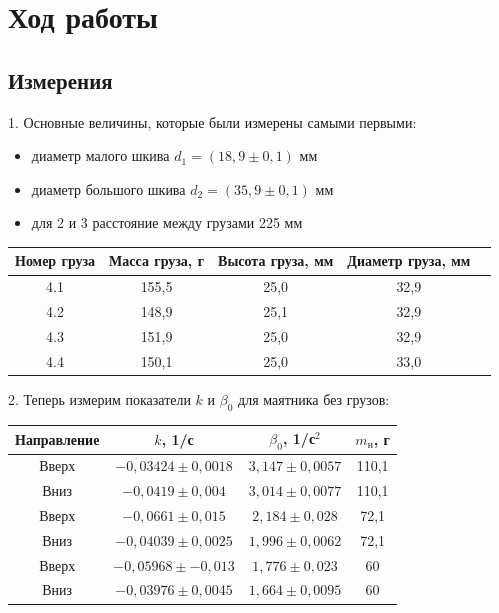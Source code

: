 \section{Ход работы}
\subsection{Измерения}
1. Основные величины, которые были измерены самыми первыми:
\begin{itemize}
    \item диаметр малого шкива $d_1 = (18,9 \pm 0,1)$ мм
    \item диаметр большого шкива $d_2 = \left(35,9 \pm 0,1\right)$ мм
    \item для 2 и 3 расстояние между грузами 225 мм
\end{itemize}
\begin{center}
\begin{tabular}{|c|c|c|c|c|}
    \hline
    Номер груза & Масса груза, г & Высота груза, мм & Диаметр груза, мм \\
    \hline
    4.1 & 155,5 & 25,0 & 32,9 \\
    \hline
    4.2 & 148,9 & 25,1 & 32,9 \\
    \hline
    4.3 & 151,9 & 25,0 & 32,9 \\
    \hline
    4.4 & 150,1 & 25,0 & 33,0 \\
    \hline
\end{tabular}
\end{center}

2. Теперь измерим показатели $k$ и $\beta_0$ для маятника без грузов:

\begin{center}
\begin{tabular}{|c|c|c|c|}
    \hline
    Направление & $k$, 1/с & $\beta_0$, 1/с$^2$ & $m_\text{н}$, г \\
    \hline
    Вверх & $-0,03424 \pm 0,0018$ & $3,147 \pm 0,0057$ & 110,1 \\
    \hline
    Вниз &$-0,0419 \pm 0,004$ & $3,014 \pm 0,0077$ & 110,1 \\
    \hline
    Вверх &$-0,0661 \pm 0,015$ & $2,184 \pm 0,028$ & 72,1 \\
    \hline
    Вниз &$-0,04039 \pm 0,0025$ & $1,996 \pm 0,0062$ & 72,1 \\
    \hline
    Вверх &$-0,05968 \pm -0,013$ & $1,776 \pm 0,023$ & 60 \\
    \hline
    Вниз &$-0,03976 \pm 0,0045$ & $1,664 \pm 0,0095$ & 60 \\
    \hline
\end{tabular}
\end{center}



